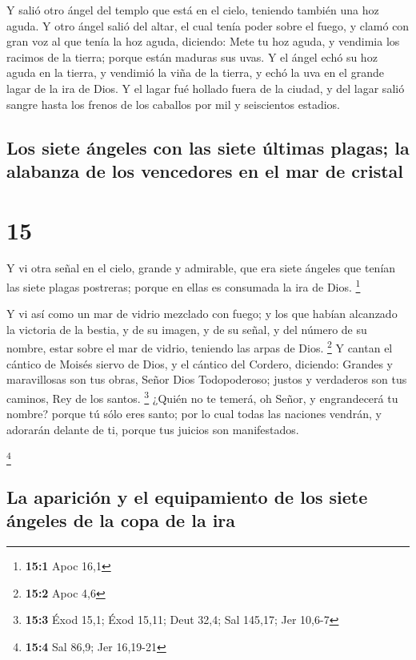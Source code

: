  Y salió otro ángel del templo que está en el cielo,
teniendo también una hoz aguda.  Y otro ángel salió del
altar, el cual tenía poder sobre el fuego, y clamó con gran voz al que
tenía la hoz aguda, diciendo: Mete tu hoz aguda, y vendimia los racimos
de la tierra; porque están maduras sus uvas.  Y el ángel
echó su hoz aguda en la tierra, y vendimió la viña de la tierra, y echó
la uva en el grande lagar de la ira de Dios.  Y el lagar
fué hollado fuera de la ciudad, y del lagar salió sangre hasta los
frenos de los caballos por mil y seiscientos estadios.

\hypertarget{los-siete-uxe1ngeles-con-las-siete-uxfaltimas-plagas-la-alabanza-de-los-vencedores-en-el-mar-de-cristal}{%
\subsection{Los siete ángeles con las siete últimas plagas; la alabanza
de los vencedores en el mar de
cristal}\label{los-siete-uxe1ngeles-con-las-siete-uxfaltimas-plagas-la-alabanza-de-los-vencedores-en-el-mar-de-cristal}}

\hypertarget{section-14}{%
\section{15}\label{section-14}}

 Y vi otra señal en el cielo, grande y admirable, que era
siete ángeles que tenían las siete plagas postreras; porque en ellas es
consumada la ira de Dios. \footnote{\textbf{15:1} Apoc 16,1}

 Y vi así como un mar de vidrio mezclado con fuego; y los
que habían alcanzado la victoria de la bestia, y de su imagen, y de su
señal, y del número de su nombre, estar sobre el mar de vidrio, teniendo
las arpas de Dios. \footnote{\textbf{15:2} Apoc 4,6}  Y
cantan el cántico de Moisés siervo de Dios, y el cántico del Cordero,
diciendo: Grandes y maravillosas son tus obras, Señor Dios Todopoderoso;
justos y verdaderos son tus caminos, Rey de los santos. \footnote{\textbf{15:3}
  Éxod 15,1; Éxod 15,11; Deut 32,4; Sal 145,17; Jer 10,6-7} 
¿Quién no te temerá, oh Señor, y engrandecerá tu nombre? porque tú sólo
eres santo; por lo cual todas las naciones vendrán, y adorarán delante
de ti, porque tus juicios son manifestados.

\footnote{\textbf{15:4} Sal 86,9; Jer 16,19-21}

\hypertarget{la-apariciuxf3n-y-el-equipamiento-de-los-siete-uxe1ngeles-de-la-copa-de-la-ira}{%
\subsection{La aparición y el equipamiento de los siete ángeles de la
copa de la
ira}\label{la-apariciuxf3n-y-el-equipamiento-de-los-siete-uxe1ngeles-de-la-copa-de-la-ira}}

